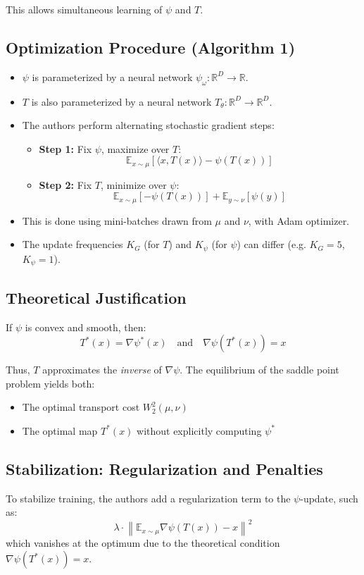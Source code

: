 \documentclass[11pt]{article}
\begin{document}
This allows simultaneous learning of $\psi$ and $T$.

\subsection*{Optimization Procedure (Algorithm 1)}

\begin{itemize}
  \item $\psi$ is parameterized by a neural network $\psi_\omega : \mathbb{R}^D \to \mathbb{R}$.
  \item $T$ is also parameterized by a neural network $T_\theta : \mathbb{R}^D \to \mathbb{R}^D$.
  \item The authors perform alternating stochastic gradient steps:
  \begin{itemize}
    \item \textbf{Step 1:} Fix $\psi$, maximize over $T$:
    \[
    \mathbb{E}_{x \sim \mu} \left[ \langle x, T(x) \rangle - \psi(T(x)) \right]
    \]
    \item \textbf{Step 2:} Fix $T$, minimize over $\psi$:
    \[
    \mathbb{E}_{x \sim \mu} \left[ -\psi(T(x)) \right] + \mathbb{E}_{y \sim \nu} \left[ \psi(y) \right]
    \]
  \end{itemize}
  \item This is done using mini-batches drawn from $\mu$ and $\nu$, with Adam optimizer.
  \item The update frequencies $K_G$ (for $T$) and $K_\psi$ (for $\psi$) can differ (e.g. $K_G = 5$, $K_\psi = 1$).
\end{itemize}

\subsection*{Theoretical Justification}
If $\psi$ is convex and smooth, then:
\[
T^*(x) = \nabla \psi^*(x) \quad \text{and} \quad \nabla \psi(T^*(x)) = x
\]

Thus, $T$ approximates the \emph{inverse} of $\nabla \psi$. The equilibrium of the saddle point problem yields both:
\begin{itemize}
  \item The optimal transport cost $W_2^2(\mu, \nu)$
  \item The optimal map $T^*(x)$ without explicitly computing $\psi^*$
\end{itemize}

\subsection*{Stabilization: Regularization and Penalties}
To stabilize training, the authors add a regularization term to the $\psi$-update, such as:
\[
\lambda \cdot \left\| \mathbb{E}_{x \sim \mu} \nabla \psi(T(x)) - x \right\|^2
\]
which vanishes at the optimum due to the theoretical condition $\nabla \psi(T^*(x)) = x$.
\end{document}
